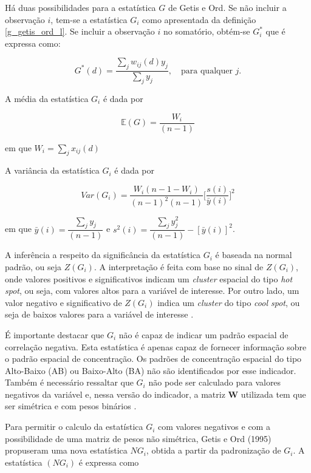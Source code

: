 \documentclass[12pt,a4paper]{article}
\begin{document}
Há duas possibilidades para a estatística $G$ de Getis e Ord. Se não incluir a observação $i$, tem-se a estatística $G_i$ como apresentada da definição \ref{g_getis_ord_l}. Se incluir a observação $i$ no somatório, obtém-se $G_i^*$ que é expressa como: 
	
\begin{equation}\label{g_getis_ord_2}
	G^*(d) = \dfrac{\sum_{j} w_{ij}(d) y_j}{\sum_{j}  y_j},\quad \text{para qualquer } j.
\end{equation}
	
A média da estatística $G_i$ é dada por 
	
\begin{equation*}
	\mathbb{E}(G) = \dfrac{W_i}{(n-1)}  
\end{equation*}
	
\noindent em que $W_i = \sum_j x_{ij}(d)$
	
A variância da estatística $G_i$ é dada por  
	
\begin{equation}
	Var(G_i)= \dfrac{W_i(n-1-W_i)}{(n-1)^2(n-1)} \bigg[\dfrac{s(i)}{\bar{y}(i)}\bigg]^2
\end{equation}
	
\noindent em que $\bar{y}(i)= \dfrac{\sum_j y_j}{(n-1)}$ e $s^2(i) = \dfrac{\sum_j y_j^2}{(n-1)} - [\bar{y}(i)]^2$. 
	
A inferência a respeito da significância da estatística $G_i$ é baseada na normal padrão, ou seja $Z(G_i)$. A interpretação é feita com base no sinal de $Z(G_i)$, onde valores positivos e significativos indicam um \textit{cluster} espacial do tipo \textit{hot spot}, ou seja, com valores altos para a variável de interesse. Por outro lado, um valor negativo e significativo de $Z(G_i)$ indica um \textit{cluster} do tipo \textit{cool spot}, ou seja de baixos valores para a variável de interesse \cite{almeida12_2}. 
	
É importante destacar que  $G_i$ não é capaz de indicar um padrão espacial de correlação negativa. Esta estatística é  apenas capaz de fornecer informação sobre o padrão espacial de concentração. Os padrões de concentração espacial do tipo Alto-Baixo (AB) ou Baixo-Alto (BA) não são identificados por esse indicador. Também é necessário ressaltar que $G_i$ não pode ser calculado para valores negativos da variável e, nessa versão do indicador, a matriz $\boldsymbol{W}$ utilizada  tem que ser simétrica e com pesos binários \cite{almeida12_2}. 
	
Para permitir o calculo da estatística $G_i$ com valores negativos e com a possibilidade de uma matriz de pesos não simétrica, Getis e Ord (1995) propuseram uma nova estatística $NG_i$, obtida a partir da padronização de $G_i$. A estatística $(NG_i)$ é expressa como 
	
\end{document}
